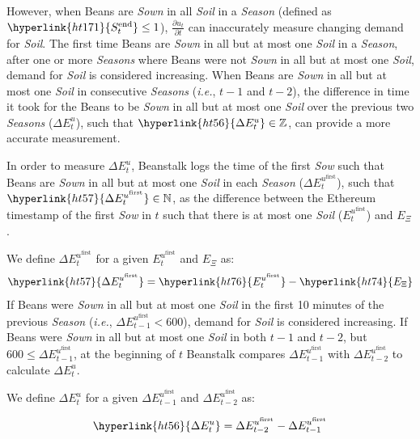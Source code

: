 \documentclass[tikz]{article}
\newcommand{\term}[1]{\textsl{#1}}
\begin{document}
However, when Beans are \term{Sown} in all \term{Soil} in a \term{Season} (defined as $\hyperlink{ht171}{S_t^{\text{end}}} \leq 1$), $\frac{\partial u_t}{\partial t}$ can inaccurately measure changing demand for \term{Soil}. The first time Beans are \term{Sown} in all but at most one \term{Soil} in a \term{Season}, after one or more \term{Seasons} where Beans were not \term{Sown} in all but at most one \term{Soil}, demand for \term{Soil} is considered increasing. When Beans are \term{Sown} in all but at most one \term{Soil} in consecutive \term{Seasons} (\term{i.e.}, $t-1$ and $t-2$), the difference in time it took for the Beans to be \term{Sown} in all but at most one \term{Soil} over the previous two \term{Seasons} (\hyperlink{ht56}{$\Delta E_{t}^{u}$}), such that $\hyperlink{ht56}{\Delta E_{t}^{u}} \in \mathbb{Z}$, can provide a more accurate measurement. 

In order to measure \hyperlink{ht56}{$\Delta E_{t}^{u}$}, Beanstalk logs the time of the first \term{Sow} such that Beans are \term{Sown} in all but at most one \term{Soil} in each \term{Season} (\hyperlink{ht57}{$\Delta E_{t}^{u^{\text{first}}}$}), such that $\hyperlink{ht57}{\Delta E_{t}^{u^{\text{first}}}} \in \mathbb{N}$, as the difference between the Ethereum timestamp of the first \term{Sow} in \hyperlink{ht204}{$t$} such that there is at most one \term{Soil} (\hyperlink{ht76}{$E_{t}^{u^{\text{first}}}$}) and \hyperlink{ht74}{$E_\Xi$}. 

We define \hyperlink{ht57}{$\Delta E_{t}^{u^{\text{first}}}$} for a given \hyperlink{ht76}{$E_{t}^{u^{\text{first}}}$} and \hyperlink{ht74}{$E_\Xi$} as:
$$\hyperlink{ht57}{\Delta E_{t}^{u^{\text{first}}}} = \hyperlink{ht76}{E_{t}^{u^{\text{first}}}} - \hyperlink{ht74}{E_\Xi}$$
If Beans were \term{Sown} in all but at most one \term{Soil} in the first 10 minutes of the previous \term{Season} (\term{i.e.}, $\Delta E_{t-1}^{u^{\text{first}}} < 600$), demand for \term{Soil} is considered increasing. If Beans were \term{Sown} in all but at most one \term{Soil} in both $t-1$ and $t-2$, but $600 \leq \Delta E_{t-1}^{u^{\text{first}}}$, at the beginning of \hyperlink{ht204}{$t$} Beanstalk compares $\Delta E_{t-1}^{u^{\text{first}}}$ with $\Delta E_{t-2}^{u^{\text{first}}}$ to calculate \hyperlink{ht56}{$\Delta E_{t}^{u}$}.

We define \hyperlink{ht56}{$\Delta E_{t}^{u}$} for a given $\Delta E_{t-1}^{u^{\text{first}}}$ and $\Delta E_{t-2}^{u^{\text{first}}}$ as:

$$\hyperlink{ht56}{\Delta E_{t}^{u}} = \Delta E_{t-2}^{u^{\text{first}}} - \Delta E_{t-1}^{u^{\text{first}}}$$
\end{document}
